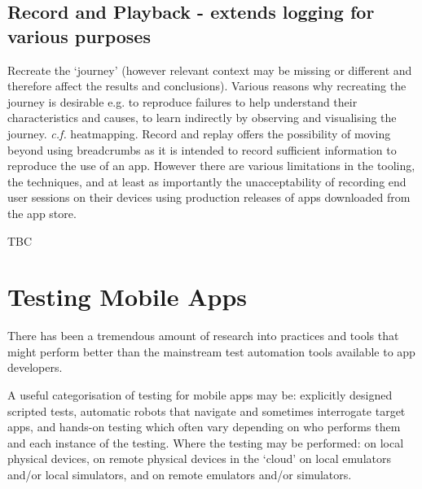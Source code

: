 \subsection{Record and Playback - extends logging for various purposes}
Recreate the `journey' (however relevant context may be missing or different and therefore affect the results and conclusions). Various reasons why recreating the journey is desirable e.g. to reproduce failures to help understand their characteristics and causes, to learn indirectly by observing and visualising the journey. \emph{c.f.} heatmapping. Record and replay offers the possibility of moving beyond using breadcrumbs as it is intended to record sufficient information to reproduce the use of an app. However there are various limitations in the tooling, the techniques, and at least as importantly the unacceptability of recording end user sessions on their devices using production releases of apps downloaded from the app store. 

TBC

\hypertarget{mobile.testing}{}
\section{Testing Mobile Apps}

There has been a tremendous amount of research into practices and tools that might perform better than the mainstream test automation tools available to app developers.

A useful categorisation of testing for mobile apps may be: 
explicitly designed scripted tests, 
automatic robots that navigate and sometimes interrogate target apps, and 
hands-on testing which often vary depending on who performs them and each instance of the testing. 
Where the testing may be performed:
on local physical devices,
on remote physical devices in the `cloud'
on local emulators and/or local simulators, and
on remote emulators and/or simulators.



